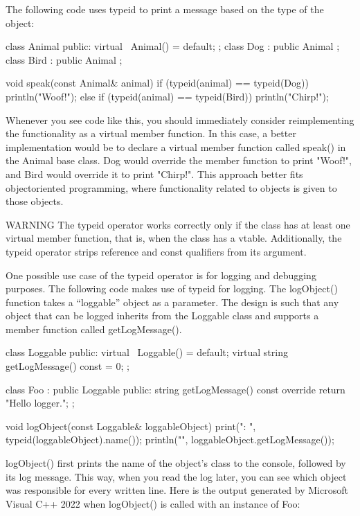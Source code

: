The following code uses typeid to print a message based on the type of the object:

\begin{cpp}
class Animal { public: virtual ~Animal() = default; };
class Dog : public Animal {};
class Bird : public Animal {};

void speak(const Animal& animal)
{
    if (typeid(animal) == typeid(Dog)) {
        println("Woof!");
    } else if (typeid(animal) == typeid(Bird)) {
        println("Chirp!");
    }
}
\end{cpp}

Whenever you see code like this, you should immediately consider reimplementing the functionality as a virtual member function. In this case, a better implementation would be to declare a virtual member function called speak() in the Animal base class. Dog would override the member function to print "Woof!", and Bird would override it to print "Chirp!". This approach better fits objectoriented programming, where functionality related to objects is given to those objects.

\begin{myWarning}{WARNING}
 The typeid operator works correctly only if the class has at least one virtual member function, that is, when the class has a vtable. Additionally, the typeid operator strips reference and const qualifiers from its argument.
\end{myWarning}

One possible use case of the typeid operator is for logging and debugging purposes. The following code makes use of typeid for logging. The logObject() function takes a “loggable” object as a parameter. The design is such that any object that can be logged inherits from the Loggable class and supports a member function called getLogMessage().

\begin{cpp}
class Loggable
{
    public:
        virtual ~Loggable() = default;
        virtual string getLogMessage() const = 0;
};

class Foo : public Loggable
{
    public:
        string getLogMessage() const override { return "Hello logger."; }
};

void logObject(const Loggable& loggableObject)
{
    print("{}: ", typeid(loggableObject).name());
    println("{}", loggableObject.getLogMessage());
}
\end{cpp}

logObject() first prints the name of the object’s class to the console, followed by its log message.
This way, when you read the log later, you can see which object was responsible for every written line. Here is the output generated by Microsoft Visual C++ 2022 when logObject() is called with an instance of Foo:

